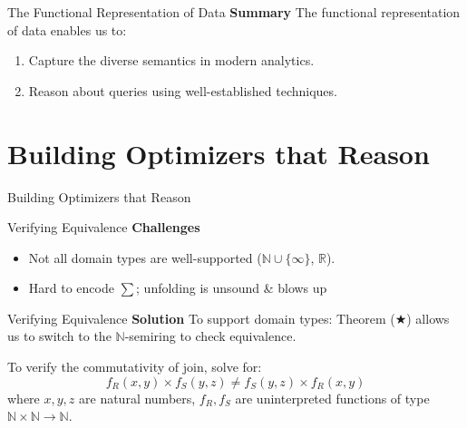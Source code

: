 \documentclass{beamer}
\newcommand{\N}{\mathbb N} %
\newcommand{\R}{\mathbb R} %
\newcommand{\set}[1]{\{#1\}}                    %
\begin{document}
  \begin{frame}{The Functional Representation of Data}
    \textbf{Summary} The functional representation of data enables us to:
    \begin{enumerate}
      \item Capture the diverse semantics in modern analytics.
      \item Reason about queries using well-established techniques.
    \end{enumerate}
  \end{frame}
  
  \section{Building Optimizers that Reason}

  \begin{frame}{Building Optimizers that Reason}

  \end{frame}

  \begin{frame}{Verifying Equivalence}
    \textbf{Challenges}
    \begin{itemize}
      \item Not all domain types are well-supported ($\N \cup \set{\infty}$, $\R$).
      \item Hard to encode $\sum$; unfolding is unsound \& blows up
    \end{itemize}
  \end{frame}
  
  \begin{frame}{Verifying Equivalence}
    \textbf{Solution} To support domain types: Theorem ($\bigstar$) 
    allows us to switch to the $\N$-semiring to check equivalence. \pause
    
    To verify the commutativity of join, solve for: 
    \[f_R(x, y) \times f_S(y, z) \neq f_S(y, z) \times f_R(x, y)\]
    where $x, y, z$ are natural numbers, $f_R, f_S$ are uninterpreted
    functions of type $\N \times \N \rightarrow \N$. 
  \end{frame}
\end{document}
